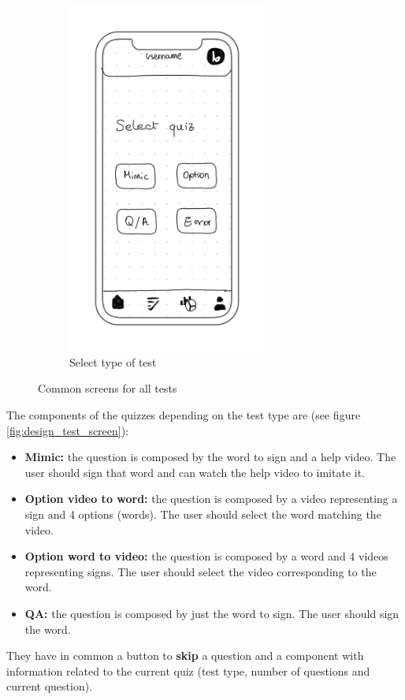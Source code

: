 \begin{figure}[H]
\begin{subfigure}[T]{0.32\textwidth}
        \includegraphics[width=0.72\textwidth]{assets/screens/quiz/common/Select quiz.png}
        \caption{Select type of test}
        \label{fig:design_screen_select_quiz}
    \end{subfigure}
       \caption{Common screens for all tests}
       \label{fig:design_test_common}
\end{figure}

The components of the quizzes depending on the test type are (see figure \ref{fig:design_test_screen}):
\begin{itemize}[noitemsep]
    \item \textbf{Mimic:} the question is composed by the word to sign and a help video. The user should sign that word and can watch the help video to imitate it.
    \item \textbf{Option video to word:} the question is composed by a video representing a sign and 4 options (words). The user should select the word matching the video.
    \item \textbf{Option word to video:} the question is composed by a word and 4 videos representing signs. The user should select the video corresponding to the word.
    \item \textbf{QA:} the question is composed by just the word to sign. The user should sign the word.
\end{itemize}
They have in common a button to \textbf{skip} a question and a component with information related to the current quiz (test type, number of questions and current question). \\

